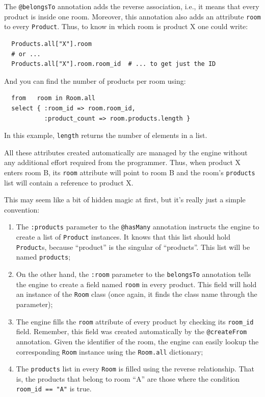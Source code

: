 \documentclass[a4,11pt]{report}
\begin{document}
The \verb=@belongsTo= annotation adds the reverse association, i.e.,
it means that every product is inside one room. Moreover, this
annotation also adds an attribute \verb=room= to every
\verb=Product=. Thus, to know in which room is product X one could
write:

\begin{lstlisting}
  Products.all["X"].room
  # or ...
  Products.all["X"].room.room_id  # ... to get just the ID
\end{lstlisting}

And you can find the number of products per room using:

\begin{lstlisting}
  from   room in Room.all
  select { :room_id => room.room_id,
           :product_count => room.products.length }
\end{lstlisting}

In this example, \verb=length= returns the number of elements in a
list.

All these attributes created automatically are managed by the engine
without any additional effort required from the programmer. Thus, when
product X enters room B, its \verb=room= attribute will point to room
B and the room's \verb=products= list will contain a reference to
product X.

This may seem like a bit of hidden magic at first, but it's really
just a simple convention:

\begin{enumerate}
\item The \verb=:products= parameter to the \verb=@hasMany= annotation
  instructs the engine to create a list of \verb=Product=
  instances. It knows that this list should hold \verb=Product=s,
  because ``product'' is the singular of ``products''. This list will
  be named \verb=products=;
\item On the other hand, the \verb=:room= parameter to the
  \verb=belongsTo= annotation tells the engine to create a field named
  \verb=room= in every product. This field will hold an instance of the
  \verb=Room= class (once again, it finds the class name through the
  parameter);
\item The engine fills the \verb=room= attribute of every product by
  checking its \verb=room_id= field. Remember, this field was created
  automatically by the \verb=@createFrom= annotation. Given the
  identifier of the room, the engine can easily lookup the
  corresponding \verb=Room= instance using the \verb=Room.all=
  dictionary;
\item The \verb=products= list in every \verb=Room= is filled using
  the reverse relationship. That is, the products that belong to room
  ``A'' are those where the condition \verb!room_id == "A"! is true.
\end{enumerate}
\end{document}

